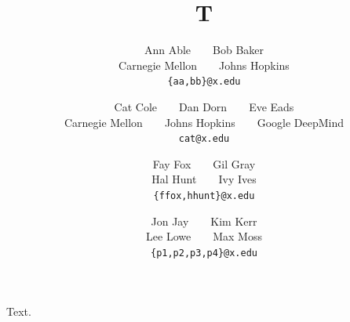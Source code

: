 \documentclass{article}
\title{T}
\author{Ann Able~~~~Bob Baker \\ Carnegie Mellon~~~~Johns Hopkins \\ \texttt{\{aa,bb\}@x.edu}
\and Cat Cole~~~~Dan Dorn~~~~Eve Eads \\ Carnegie Mellon~~~~Johns Hopkins~~~~Google DeepMind \\ \texttt{cat@x.edu}
\and Fay Fox~~~~Gil Gray \\ Hal Hunt~~~~Ivy Ives \\ \texttt{\{ffox,hhunt\}@x.edu}
\and Jon Jay~~~~Kim Kerr \\ Lee Lowe~~~~Max Moss \\ \texttt{\{p1,p2,p3,p4\}@x.edu}}
\begin{document}
\maketitle
Text.
\end{document}
